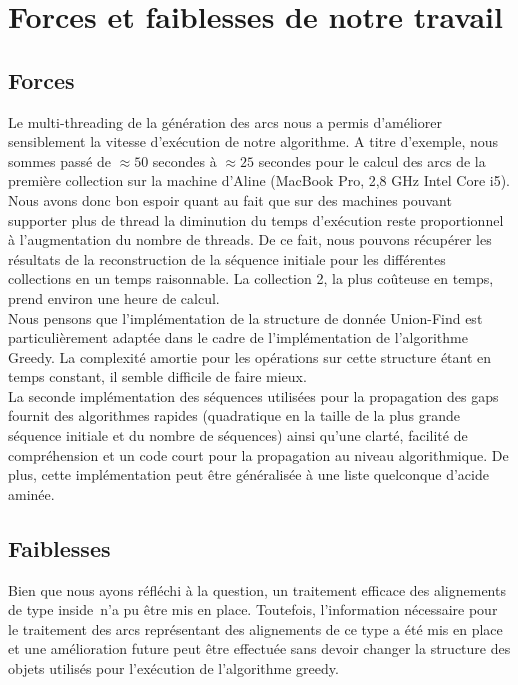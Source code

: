 
\section{Forces et faiblesses de notre travail}

\subsection{Forces}

Le multi-threading de la génération des arcs nous a permis d'améliorer sensiblement la vitesse d'exécution de notre algorithme. A titre d'exemple, nous sommes passé de $\approx 50$ secondes à $\approx 25$ secondes pour le calcul des arcs de la première collection sur la machine d'Aline (MacBook Pro, 2,8 GHz Intel Core i5). Nous avons donc bon espoir quant au fait que sur des machines pouvant supporter plus de thread la diminution du temps d'exécution reste proportionnel à l'augmentation du nombre de threads. De ce fait, nous pouvons récupérer les résultats de la reconstruction de la séquence initiale pour les différentes collections en un temps raisonnable. La collection 2, la plus coûteuse en temps, prend environ une heure de calcul.\\

Nous pensons que l'implémentation de la structure de donnée Union-Find est particulièrement adaptée dans le cadre de l'implémentation de l'algorithme Greedy. La complexité amortie pour les opérations sur cette structure étant en temps constant, il semble difficile de faire mieux.\\

La seconde implémentation des séquences utilisées pour la propagation des gaps
fournit des algorithmes rapides (quadratique en la taille de la plus grande séquence initiale et
du nombre de séquences) ainsi qu'une clarté, facilité de compréhension et un
code court pour la propagation au niveau algorithmique. De plus, cette
implémentation peut être généralisée à une liste quelconque d'acide aminée.


\subsection{Faiblesses}

Bien que nous ayons réfléchi à la question, un traitement efficace des alignements de type \og inside\fg~n'a pu être mis en place. Toutefois, l'information nécessaire pour le traitement des arcs représentant des alignements de ce type a été mis en place et une amélioration future peut être effectuée sans devoir changer la structure des objets utilisés pour l'exécution de l'algorithme greedy.

